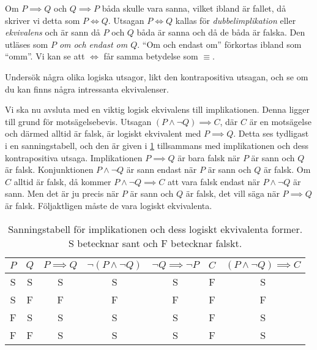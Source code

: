 Om \(P\implies Q\) och \(Q\implies P\) båda skulle vara sanna, vilket ibland är 
fallet, då skriver vi detta som \(P\iff Q\).
Utsagan \(P\iff Q\) kallas för 
\emph{dubbelimplikation} eller
\emph{ekvivalens} och är sann då \(P\) och \(Q\) båda 
är sanna och då de båda är falska.
Den utläses som \emph{\(P\) om och endast om \(Q\)}.
\enquote{Om och endast om} förkortas ibland som \enquote{omm}.
Vi kan se att \(\iff\) får samma betydelse som \(\equiv\).

\begin{exercise}
  Undersök några olika logiska utsagor, likt den kontrapositiva utsagan, och se 
  om du kan finns några intressanta ekvivalenser.
\end{exercise}

Vi ska nu avsluta med en viktig logisk ekvivalens till implikationen.
Denna ligger till grund för motsägelsebevis.
Utsagan \((P\land\lnot Q)\implies C\), där \(C\) är en motsägelse och
därmed alltid är falsk, är logiskt ekvivalent med \(P\implies Q\).
Detta ses tydligast i en sanningstabell, och den är given i
\cref{tbl:SanningImplikation} tillsammans med implikationen och dess
kontrapositiva utsaga.
Implikationen \(P\implies Q\) är bara falsk när \(P\) är sann och \(Q\) är
falsk.
Konjunktionen \(P\land\lnot Q\) är sann endast när \(P\) är sann och \(Q\) är
falsk.
Om \(C\) alltid är falsk, då kommer \(P\land\lnot Q\implies C\) att vara falsk
endast när \(P\land\lnot Q\) är sann.
Men det är ju precis när \(P\) är sann och \(Q\) är falsk, det vill säga när
\(P\implies Q\) är falsk.
Följaktligen måste de vara logiskt ekvivalenta.

\begin{table}
  \caption{%
    Sanningstabell för implikationen och dess logiskt ekvivalenta former.
    S betecknar sant och F betecknar falskt.
  }
  \begin{tabular}{ccccccc}
    \(P\) &
    \(Q\) &
    \(P\implies Q\) &
    \(\lnot(P\land \lnot Q)\) &
    \(\lnot Q\implies \lnot P\) &
    \(C\) & \((P\land\lnot Q)\implies C\) \\
    \toprule
    S & S & S & S & S & F & S \\
    S & F & F & F & F & F & F \\
    F & S & S & S & S & F & S \\
    F & F & S & S & S & F & S \\
    \bottomrule
  \end{tabular}\label{tbl:SanningImplikation}
\end{table}



